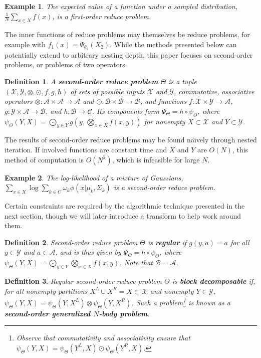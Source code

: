 \documentclass{article}
\newtheorem{definition} {Definition}
\newtheorem{example} {Example}
\newcommand{\GNP}[1][\psi]{{#1}_{\Theta}}
\newcommand{\comp}{\mathbin{\circ}}
\begin{document}
\begin{example}
  The expected value of a function under a sampled distribution,
  $\frac{1}{N} \sum_{x \in X} f(x)$, is a first-order reduce problem.
\end{example}

The inner functions of reduce problems may themselves be reduce
problems, for example with $f_1(x) = \Psi_{\theta_2}(X_2)$.  While the
methods presented below can potentially extend to arbitrary nesting
depth, this paper focuses on second-order problems, or problems of two
operators.
\begin{definition}
  A {\bf second-order reduce problem} $\Theta$ is a tuple
  $(\mathcal{X},\mathcal{Y},\otimes,\odot,f,g,h)$ of sets of possible
  inputs $\mathcal{X}$ and $\mathcal{Y}$, commutative, associative
  operators $\otimes \colon \mathcal{A} \times \mathcal{A} \to
  \mathcal{A}$ and $\odot \colon \mathcal{B} \times \mathcal{B} \to
  \mathcal{B}$, and functions $f \colon \mathcal{X} \times \mathcal{Y}
  \to \mathcal{A}$, $g \colon \mathcal{Y} \times \mathcal{A} \to
  \mathcal{B}$, and $h \colon \mathcal{B} \to \mathcal{C}$.  Its
  components form $\Psi_{\Theta} = h \comp \psi_{\Theta}$, where
  $\psi_{\Theta}(Y,X) = \bigodot_{y \in Y} g \left( y,\bigotimes_{x
  \in X} f(x,y) \right)$ for nonempty $X \subset \mathcal{X}$ and $Y
  \subset \mathcal{Y}$.
\end{definition}
\noindent The results of second-order reduce problems may be found
na\"{\i}vely through nested iteration.  If involved functions are
constant time and $X$ and $Y$ are $O(N)$, this method of computation
is $O(N^2)$, which is infeasible for large $N$.

\begin{example}
  The log-likelihood of a mixture of Gaussians, $\sum_{x \in X} \log
  \sum_{k \in C} \omega_k \phi(x | \mu_k, \Sigma_k)$ is a second-order
  reduce problem.
\end{example}

Certain constraints are required by the algorithmic technique
presented in the next section, though we will later introduce a
transform to help work around them.
\begin{definition}
  Second-order reduce problem $\Theta$ is {\bf regular} if $g(y,a) =
  a$ for all $y \in \mathcal{Y}$ and $a \in \mathcal{A}$, and is thus
  given by $\Psi_{\Theta} = h \comp \psi_{\Theta}$, where
  $\psi_{\Theta}(Y,X) = \bigodot_{y \in Y} \bigotimes_{x \in X}
  f(x,y)$.  Note that $\mathcal{B} = \mathcal{A}$.
\end{definition}
\begin{definition}
  Regular second-order reduce problem $\Theta$ is {\bf block
  decomposable} if, for all nonempty partitions $X^{\!L} \cup X^{\!R}
  = X \subset \mathcal{X}$ and nonempty $Y \in \mathcal{Y}$,
  $\GNP(Y,X) = \GNP(Y,X^{\!L}) \otimes \GNP(Y,X^{\!R})$.  Such a
  problem\footnote{Observe that commutativity and associativity ensure
  that $\GNP(Y,X) = \GNP(Y^{\!L},X) \odot \GNP(Y^{\!R},X)$.} is known
  as a {\bf second-order generalized $N$-body problem}.
\end{definition}
\end{document}
